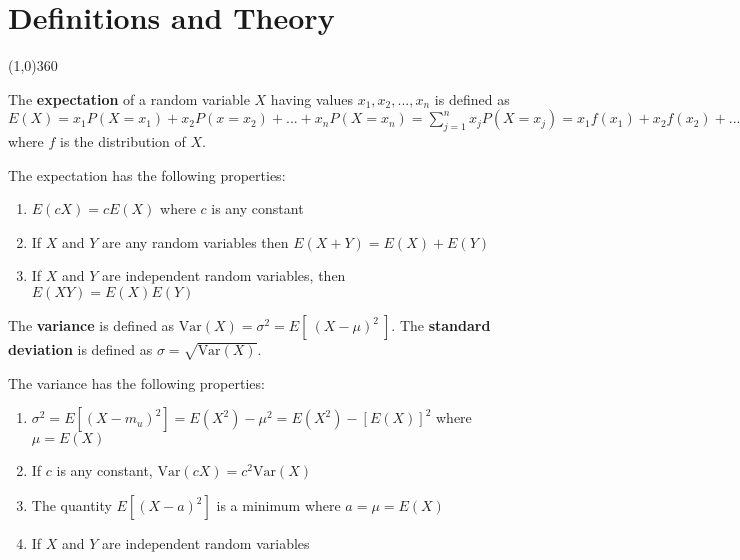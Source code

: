 \chapter{Definitions and Theory}
\line(1,0){360} \\

\begin{defn}
    The \textbf{expectation} of a random variable $X$ having values $x_1, x_2, ..., x_n$ is defined as $E\left (X\right ) = x_1  P\left (X = x_1\right ) + x_2 P\left (x = x_2\right ) + ... + x_n P\left (X = x_n\right ) =  \sum_{j = 1}^n x_j P\left (X = x_j\right ) = x_1 f\left (x_1\right ) + x_2 f\left (x_2\right ) + ... + x_n f\left (x_n\right ) = \sum_{j=1} \to n x_j f\left (x_j\right )$ where $f$ is the distribution of $X$.
\end{defn}


\begin{samepage}
\begin{thm}  
    The expectation has the following properties:

    \begin{enumerate}
        \item $E(c X) = c E(X)$ where $c$ is any constant
        \item If $X$ and $Y$ are any random variables then $E(X + Y) = E(X) + E(Y)$
        \item If $X$ and $Y$ are independent random variables, then $E(XY) = E(X)E(Y)$
    \end{enumerate}
\end{thm}
\end{samepage}

\begin{defn}
    The \textbf{variance} is defined as $\text{Var} (X) = \sigma ^2 = E[ \  (X - \mu)^2 \  ]$.
    The \textbf{standard deviation} is defined as $\sigma = \sqrt{\text{Var} (X)}$.
\end{defn}

\begin{samepage}
\begin{thm}
    The variance has the following properties:

    \begin{enumerate}
        \item $\sigma ^2 = E\left [ \left (X - m_u\right ) ^2 \right ] = E\left (X ^2\right ) - \mu ^2 = E\left (X ^2\right ) - \left [E\left (X\right )\right ] ^2$ where $\mu = E\left (X\right )$
        \item If $c$ is any constant, $\text{Var}(cX) = c^2 \text{Var}(X)$
        \item The quantity $E[ (X - a)^2 ]$ is a minimum where $a = \mu = E(X)$
        \item If $X$ and $Y$ are independent random variables
    \end{enumerate}
\end{thm}
\end{samepage}

